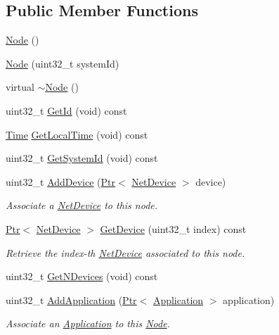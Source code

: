 \subsection*{Public Member Functions}
\begin{DoxyCompactItemize}
\item 
\hyperlink{classns3_1_1Node_acafd181365f06486940e936c90e90e21}{Node} ()
\item 
\hyperlink{classns3_1_1Node_a7bdf7d30fa475fe20e7c01bdf728ce5b}{Node} (uint32\+\_\+t system\+Id)
\item 
virtual \hyperlink{classns3_1_1Node_a1bf4c4277205b27b6febaeb659c0e025}{$\sim$\+Node} ()
\item 
uint32\+\_\+t \hyperlink{classns3_1_1Node_aaf49b64a843565ce3812326313b370ac}{Get\+Id} (void) const 
\item 
\hyperlink{classns3_1_1Time}{Time} \hyperlink{classns3_1_1Node_a45a025ee4ff7f5080ddf06be0a57a414}{Get\+Local\+Time} (void) const 
\item 
uint32\+\_\+t \hyperlink{classns3_1_1Node_a13740abb36295ad68e551de5b4e328d5}{Get\+System\+Id} (void) const 
\item 
uint32\+\_\+t \hyperlink{classns3_1_1Node_a42ff83ee1d5d1649c770d3f5b62375de}{Add\+Device} (\hyperlink{classns3_1_1Ptr}{Ptr}$<$ \hyperlink{classns3_1_1NetDevice}{Net\+Device} $>$ device)
\begin{DoxyCompactList}\small\item\em Associate a \hyperlink{classns3_1_1NetDevice}{Net\+Device} to this node. \end{DoxyCompactList}\item 
\hyperlink{classns3_1_1Ptr}{Ptr}$<$ \hyperlink{classns3_1_1NetDevice}{Net\+Device} $>$ \hyperlink{classns3_1_1Node_a5918dfd24ef632efc9a83a5f6561c76e}{Get\+Device} (uint32\+\_\+t index) const 
\begin{DoxyCompactList}\small\item\em Retrieve the index-\/th \hyperlink{classns3_1_1NetDevice}{Net\+Device} associated to this node. \end{DoxyCompactList}\item 
uint32\+\_\+t \hyperlink{classns3_1_1Node_a531554d2241ba4fa1cd74e3360be6bce}{Get\+N\+Devices} (void) const 
\item 
uint32\+\_\+t \hyperlink{classns3_1_1Node_ab98b4fdc4aadc86366b80e8a79a53f47}{Add\+Application} (\hyperlink{classns3_1_1Ptr}{Ptr}$<$ \hyperlink{classns3_1_1Application}{Application} $>$ application)
\begin{DoxyCompactList}\small\item\em Associate an \hyperlink{classns3_1_1Application}{Application} to this \hyperlink{classns3_1_1Node}{Node}. \end{DoxyCompactList}\item 

\end{DoxyCompactItemize}

